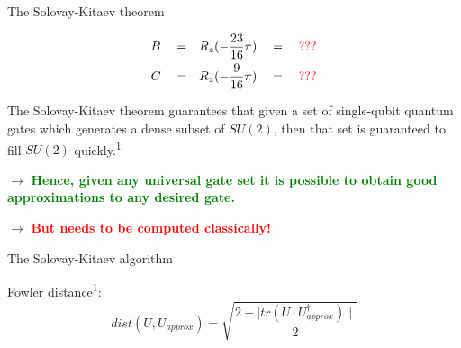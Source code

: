 \documentclass[10pt]{beamer}
\begin{document}
{
\begin{frame}{The Solovay-Kitaev theorem}

\begin{align}
B\quad =&\quad R_z(-\frac{23}{16}\pi) \quad= \quad \textcolor{red}{???}  \\
C \quad=&\quad R_z(-\frac{9}{16}\pi) \quad= \quad \textcolor{red}{???}
\end{align}

The Solovay-Kitaev theorem guarantees that given a set of single-qubit quantum gates which generates a dense subset of $SU(2)$, then that set is guaranteed to fill $SU(2)$ quickly.\textsuperscript{1}
 
$\rightarrow$ \textcolor{green}{\textbf{Hence, given any universal gate set it is possible to obtain good approximations to any desired gate.}}

$\rightarrow$ \textcolor{red}{\textbf{But needs to be computed classically!}}

\end{frame}
}

{
\begin{frame}{The Solovay-Kitaev algorithm}

Fowler distance\textsuperscript{1}:
\begin{equation}
dist(U,U_{approx}) = \sqrt{\frac{2-\mid tr(U\cdot U_{approx}^\dagger)\mid}{2}}
\end{equation}

\begin{figure}
  \end{figure}

\end{frame}
}
\end{document}
